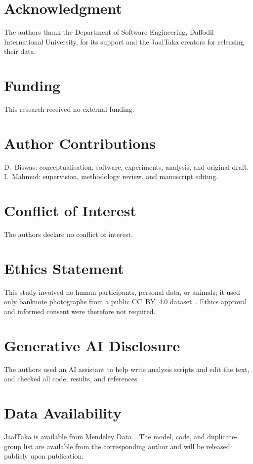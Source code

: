 \documentclass[journal,onecolumn]{IEEEtran}
\begin{document}
\section*{Acknowledgment}
The authors thank the Department of Software Engineering, Daffodil International
University, for its support and the JaalTaka creators for releasing their data.

\section*{Funding}
This research received no external funding.

\section*{Author Contributions}
D.~Biswas: conceptualisation, software, experiments, analysis, and original draft.
I.~Mahmud: supervision, methodology review, and manuscript editing.

\section*{Conflict of Interest}
The authors declare no conflict of interest.

\section*{Ethics Statement}
This study involved no human participants, personal data, or animals; it used only
banknote photographs from a public CC~BY~4.0 dataset~\cite{jaaltaka_data}. Ethics
approval and informed consent were therefore not required.

\section*{Generative AI Disclosure}
The authors used an AI assistant to help write analysis scripts and edit the text, and
checked all code, results, and references.

\section*{Data Availability}
JaalTaka is available from Mendeley Data~\cite{jaaltaka_data}. The model, code, and
duplicate-group list are available from the corresponding author and will be released
publicly upon publication.
\end{document}
